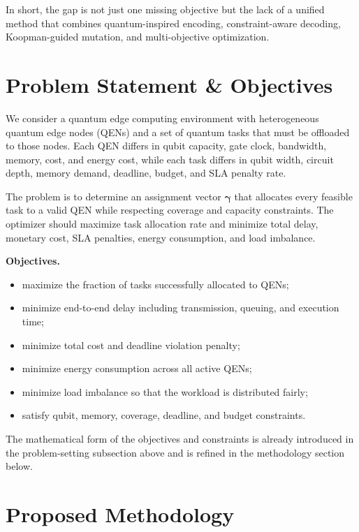 \documentclass[12pt,a4paper]{article}
\begin{document}
In short, the gap is not just one missing objective but the lack of a unified method that combines quantum-inspired encoding, constraint-aware decoding, Koopman-guided mutation, and multi-objective optimization.

\section{Problem Statement \& Objectives}

We consider a quantum edge computing environment with heterogeneous quantum edge nodes (QENs) and a set of quantum tasks that must be offloaded to those nodes. Each QEN differs in qubit capacity, gate clock, bandwidth, memory, cost, and energy cost, while each task differs in qubit width, circuit depth, memory demand, deadline, budget, and SLA penalty rate.

The problem is to determine an assignment vector $\boldsymbol{\gamma}$ that allocates every feasible task to a valid QEN while respecting coverage and capacity constraints. The optimizer should maximize task allocation rate and minimize total delay, monetary cost, SLA penalties, energy consumption, and load imbalance.

\textbf{Objectives.}
\begin{itemize}[leftmargin=*]
    \item maximize the fraction of tasks successfully allocated to QENs;
    \item minimize end-to-end delay including transmission, queuing, and execution time;
    \item minimize total cost and deadline violation penalty;
    \item minimize energy consumption across all active QENs;
    \item minimize load imbalance so that the workload is distributed fairly;
    \item satisfy qubit, memory, coverage, deadline, and budget constraints.
\end{itemize}

The mathematical form of the objectives and constraints is already introduced in the problem-setting subsection above and is refined in the methodology section below.

\section{Proposed Methodology}
\end{document}

